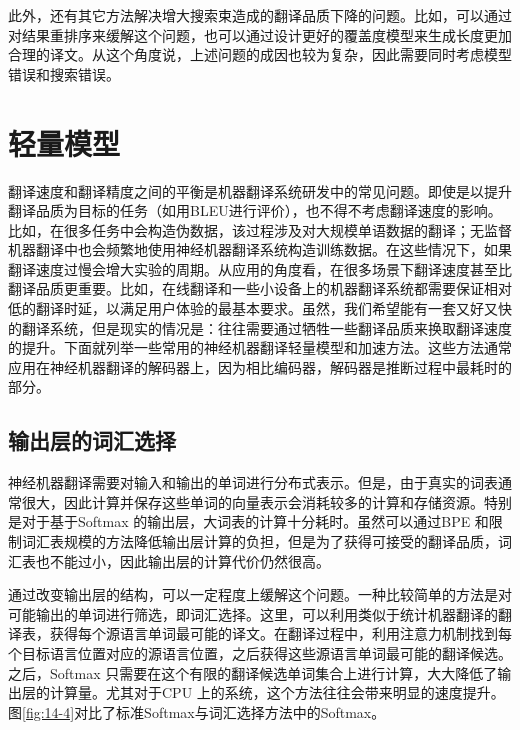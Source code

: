 \parinterval 此外，还有其它方法解决增大搜索束造成的翻译品质下降的问题。比如，可以通过对结果重排序来缓解这个问题，也可以通过设计更好的覆盖度模型来生成长度更加合理的译文。从这个角度说，上述问题的成因也较为复杂，因此需要同时考虑模型错误和搜索错误。

\sectionnewpage
\section{轻量模型}\label{sec:14-3}

\parinterval 翻译速度和翻译精度之间的平衡是机器翻译系统研发中的常见问题。即使是以提升翻译品质为目标的任务（如用BLEU进行评价），也不得不考虑翻译速度的影响。比如，在很多任务中会构造伪数据，该过程涉及对大规模单语数据的翻译；无监督机器翻译中也会频繁地使用神经机器翻译系统构造训练数据。在这些情况下，如果翻译速度过慢会增大实验的周期。从应用的角度看，在很多场景下翻译速度甚至比翻译品质更重要。比如，在线翻译和一些小设备上的机器翻译系统都需要保证相对低的翻译时延，以满足用户体验的最基本要求。虽然，我们希望能有一套又好又快的翻译系统，但是现实的情况是：往往需要通过牺牲一些翻译品质来换取翻译速度的提升。下面就列举一些常用的神经机器翻译轻量模型和加速方法。这些方法通常应用在神经机器翻译的解码器上，因为相比编码器，解码器是推断过程中最耗时的部分。


\subsection{输出层的词汇选择}

\parinterval 神经机器翻译需要对输入和输出的单词进行分布式表示。但是，由于真实的词表通常很大，因此计算并保存这些单词的向量表示会消耗较多的计算和存储资源。特别是对于基于Softmax 的输出层，大词表的计算十分耗时。虽然可以通过BPE 和限制词汇表规模的方法降低输出层计算的负担，但是为了获得可接受的翻译品质，词汇表也不能过小，因此输出层的计算代价仍然很高。

\parinterval 通过改变输出层的结构，可以一定程度上缓解这个问题。一种比较简单的方法是对可能输出的单词进行筛选，即词汇选择。这里，可以利用类似于统计机器翻译的翻译表，获得每个源语言单词最可能的译文。在翻译过程中，利用注意力机制找到每个目标语言位置对应的源语言位置，之后获得这些源语言单词最可能的翻译候选。之后，Softmax 只需要在这个有限的翻译候选单词集合上进行计算，大大降低了输出层的计算量。尤其对于CPU 上的系统，这个方法往往会带来明显的速度提升。图\ref{fig:14-4}对比了标准Softmax与词汇选择方法中的Softmax。

